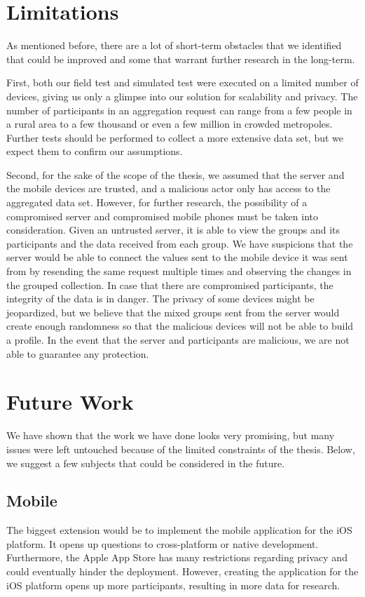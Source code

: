 \section{Limitations}
As mentioned before, there are a lot of short-term obstacles that we identified that could be improved and some that warrant further research in the long-term.

First, both our field test and simulated test were executed on a limited number of devices, giving us only a glimpse into our solution for scalability and privacy. The number of participants in an aggregation request can range from a few people in a rural area to a few thousand or even a few million in crowded metropoles. Further tests should be performed to collect a more extensive data set, but we expect them to confirm our assumptions.

Second, for the sake of the scope of the thesis, we assumed that the server and the mobile devices are trusted, and a malicious actor only has access to the aggregated data set. However, for further research, the possibility of a compromised server and compromised mobile phones must be taken into consideration. Given an untrusted server, it is able to view the groups and its participants and the data received from each group. We have suspicions that the server would be able to connect the values sent to the mobile device it was sent from by resending the same request multiple times and observing the changes in the grouped collection. In case that there are compromised participants, the integrity of the data is in danger. The privacy of some devices might be jeopardized, but we believe that the mixed groups sent from the server would create enough randomness so that the malicious devices will not be able to build a profile. In the event that the server and participants are malicious, we are not able to guarantee any protection.

\section{Future Work}
We have shown that the work we have done looks very promising, but many issues were left untouched because of the limited constraints of the thesis. Below, we suggest a few subjects that could be considered in the future. 

\subsection{Mobile}
The biggest extension would be to implement the mobile application for the iOS platform. It opens up questions to cross-platform or native development. Furthermore, the Apple App Store has many restrictions regarding privacy and could eventually hinder the deployment. However, creating the application for the iOS platform opens up more participants, resulting in more data for research.


